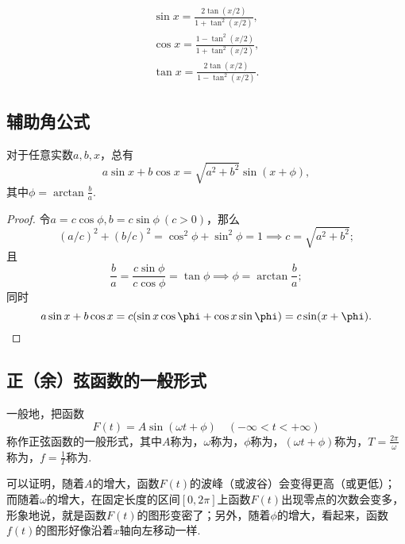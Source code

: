 \begin{theorem}[万能公式]
\begin{gather}
	\sin x = \frac{2 \tan(x/2)}{1+\tan^2(x/2)}, \\
	\cos x = \frac{1-\tan^2(x/2)}{1+\tan^2(x/2)}, \\
	\tan x = \frac{2 \tan(x/2)}{1-\tan^2(x/2)}.
\end{gather}
\end{theorem}

\subsection{辅助角公式}
\begin{theorem}[辅助角公式]
对于任意实数\(a,b,x\)，总有
\begin{equation}
a \sin x + b \cos x = \sqrt{a^2 + b^2} \sin(x + \phi),
\end{equation}
其中\(\phi = \arctan\frac{b}{a}\).
\begin{proof}
令\(a = c \cos\phi,
b = c \sin\phi\ (c>0)\)，那么
\[
\left(a/c\right)^2+\left(b/c\right)^2
=\cos^2\phi+\sin^2\phi
=1
\implies
c = \sqrt{a^2+b^2};
\]
且\[
\frac{b}{a} = \frac{c \sin\phi}{c \cos\phi} = \tan\phi
\implies
\phi = \arctan\frac{b}{a};
\]
同时
\[
a \sin x + b \cos x
= c (\sin x \cos\phi + \cos x \sin\phi)
= c \sin(x+\phi).
\qedhere
\]
\end{proof}
\end{theorem}

\subsection{正（余）弦函数的一般形式}
\begin{definition}
一般地，把函数\[
F(t) = A \sin(\omega t + \phi) \quad (-\infty<t<+\infty)
\]称作正弦函数的一般形式，其中\(A\)称为，\(\omega\)称为，\(\phi\)称为，\((\omega t + \phi)\)称为，\(T = \frac{2\pi}{\omega}\)称为，\(f = \frac{1}{T}\)称为.
\end{definition}
可以证明，随着\(A\)的增大，函数\(F(t)\)的波峰（或波谷）会变得更高（或更低）；而随着\(\omega\)的增大，在固定长度的区间\([0,2\pi]\)上函数\(F(t)\)出现零点的次数会变多，形象地说，就是函数\(F(t)\)的图形变密了；另外，随着\(\phi\)的增大，看起来，函数\(f(t)\)的图形好像沿着\(x\)轴向左移动一样.
